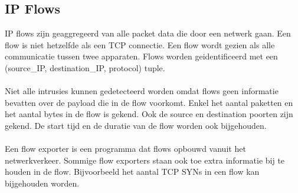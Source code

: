 \begin{samenvatting}
\section{IP Flows}
IP flows zijn geaggregeerd van alle packet data die door een netwerk gaan. Een flow is niet hetzelfde als een TCP connectie. Een flow wordt gezien als alle communicatie tussen twee apparaten. Flows worden geidentificeerd met een (source\_IP, destination\_IP, protocol) tuple. \\
\\
Niet alle intrusies kunnen gedetecteerd worden omdat flows geen informatie bevatten over de payload die in de flow voorkomt. Enkel het aantal paketten en het aantal bytes in de flow is gekend. Ook de source en destination poorten zijn gekend. De start tijd en de duratie van de flow worden ook bijgehouden. \\
\\
Een flow exporter is een programma dat flows opbouwd vanuit het netwerkverkeer. Sommige flow exporters staan ook toe extra informatie bij te houden in de flow. Bijvoorbeeld het aantal TCP SYNs in een flow kan bijgehouden worden. 


\end{samenvatting}
